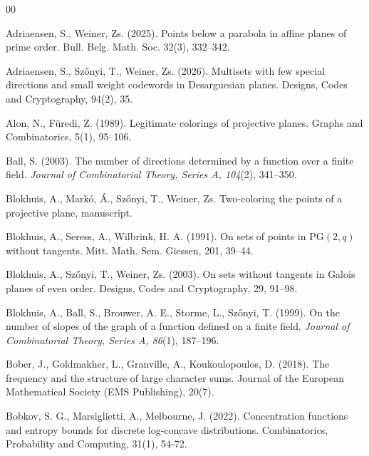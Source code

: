\documentclass[10pt]{article}
\newcommand{\PG}{\mathrm{PG}}
\theoremstyle{definition}
\begin{document}
	
	\begin{thebibliography}{00}
		
		 Adriaensen, S.,  Weiner, Zs. (2025). Points below a parabola in affine planes of prime order. Bull. Belg. Math. Soc. 32(3), 332--342.
		
		Adriaensen, S., Szőnyi, T.,  Weiner, Zs. (2026). Multisets with few special directions and small weight codewords in Desarguesian planes. Designs, Codes and Cryptography, 94(2), 35.
		
		 Alon, N.,  Füredi, Z. (1989). Legitimate colorings of projective planes. Graphs and Combinatorics, 5(1), 95--106.
		
		
		
		Ball, S. (2003). The number of directions determined by a function over a finite field. \textit{Journal of Combinatorial Theory, Series A, 104}(2), 341--350.
		
		
		
		 Blokhuis,  A.,  Mark\'o, Á., Sz\H onyi, T.,  Weiner, Zs. Two-coloring the points of a projective plane, manuscript.
		
		
		
		 Blokhuis, A., Seress, A.,  Wilbrink, H. A. (1991). On sets of points in $\PG(2, q)$ without tangents. Mitt. Math. Sem. Giessen, 201, 39--44.
		
		 Blokhuis, A., Szőnyi, T., Weiner, Zs. (2003). On sets without tangents in Galois planes of even order. Designs, Codes and Cryptography, 29, 91--98.
		
		
		Blokhuis, A., Ball, S., Brouwer, A. E., Storme, L.,  Szőnyi, T. (1999). On the number of slopes of the graph of a function defined on a finite field. \textit{Journal of Combinatorial Theory, Series A, 86}(1), 187--196.
		
		Bober, J., Goldmakher, L., Granville, A.,  Koukoulopoulos, D. (2018). The frequency and the structure of large character sums. Journal of the European Mathematical Society (EMS Publishing), 20(7).
		
		 Bobkov, S. G., Marsiglietti, A.,  Melbourne, J. (2022). Concentration functions and entropy bounds for discrete log-concave distributions. Combinatorics, Probability and Computing, 31(1), 54-72.
		

\end{thebibliography}
\end{document}
